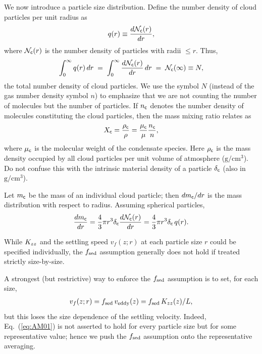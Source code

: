 We now introduce a particle size distribution.  
Define the number density of cloud particles per unit radius as
\begin{align}
    q(r) \equiv \frac{d \mathcal{N}_{\mathsf{c}} (r)}{d r},
\end{align}
where $\mathcal{N}_{\mathsf{c}}(r)$ is the number density of particles with radii $\le r$.  
Thus,
\begin{align}
    \int_0^\infty q(r)\, dr \;=\; \int_0^\infty \frac{d \mathcal{N}_{\mathsf{c}} (r)}{d r} \, dr \;=\; \mathcal{N}_{\mathsf{c}} (\infty) \equiv N,
\end{align}
the total number density of cloud particles.  
We use the symbol $N$ (instead of the gas number density symbol $n$) to emphasize that we are not counting the number of molecules but the number of particles.  
If $n_{\mathsf{c}}$ denotes the number density of molecules constituting the cloud particles, then the mass mixing ratio relates as
\begin{align}
    X_{\mathsf{c}} = \frac{\rho_{\mathsf{c}}}{\rho} = \frac{\mu_{\mathsf{c}}}{\mu} \frac{n_{\mathsf{c}}}{n},
\end{align}
where ${\mu_{\mathsf{c}}}$ is the molecular weight of the condensate species.  
Here $\rho_{\mathsf{c}}$ is the mass density occupied by all cloud particles per unit volume of atmosphere ($\mathrm{g/cm^3}$).  
Do not confuse this with the intrinsic material density of a particle $\delta_{\mathsf{c}}$ (also in $\mathrm{g/cm^3}$).

Let $m_{\mathsf{c}}$ be the mass of an individual cloud particle; then $dm_{\mathsf{c}}/dr$ is the mass distribution with respect to radius.  
Assuming spherical particles,
\begin{align}
    \frac{dm_{\mathsf{c}}}{dr} = \frac{4}{3} \pi r^3 \delta_{\mathsf{c}} \frac{d \mathcal{N}_{\mathsf{c}} (r)}{d r} = \frac{4}{3} \pi r^3 \delta_{\mathsf{c}}\, q(r).
\end{align}

While $K_{zz}$ and the settling speed $v_f(z;r)$ at each particle size $r$ could be specified individually, the $f_\mathrm{sed}$ assumption generally does not hold if treated strictly size-by-size.

A strongest (but restrictive) way to enforce the $f_\mathrm{sed}$ assumption is to set, for each size,
\begin{align}
v_f(z; r)= f_\mathrm{sed}\, v_\mathrm{eddy}(z) = f_\mathrm{sed}\, K_{zz}(z)/L,
\end{align}
but this loses the size dependence of the settling velocity.  
Indeed, Eq.~(\ref{eq:AM01}) is not asserted to hold for every particle size but for some representative value; hence we push the $f_\mathrm{sed}$ assumption onto the representative averaging.

